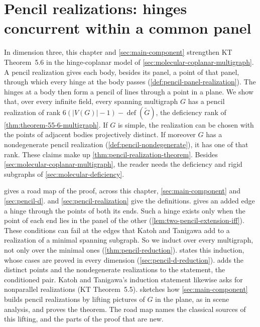 \section{Pencil realizations: hinges concurrent within a common panel}
\label{sec:pencil}

In dimension three, this chapter and \cref{sec:main-component}
strengthen KT Theorem~5.6 in the hinge-coplanar model of
\cref{sec:molecular-coplanar-multigraph}. A pencil realization gives
each body, besides its panel, a point of that panel, through which every
hinge at the body passes (\cref{def:pencil-panel-realization}). The
hinges at a body then form a pencil of lines through a point in a plane.
We show that, over every infinite field, every spanning multigraph $G$
has a pencil realization of rank
$6(|V(G)| - 1) - \operatorname{def}(\tilde G)$, the deficiency rank of
\cref{thm:theorem-55-6-multigraph}. If $G$ is simple, the realization
can be chosen with the points of adjacent bodies projectively distinct.
If moreover $G$ has a nondegenerate pencil realization
(\cref{def:pencil-nondegenerate}), it has one of that rank. These claims
make up \cref{thm:pencil-realization-theorem}. Besides
\cref{sec:molecular-coplanar-multigraph}, the reader needs the
deficiency and rigid subgraphs of \cref{sec:molecular-deficiency}.

 gives a road map of the proof, across this
chapter, \cref{sec:main-component} and \cref{sec:pencil-d}.
 and \cref{sec:pencil-realization} give
the definitions.  gives an added edge a
hinge through the points of both its ends. Such a hinge exists only when
the point of each end lies in the panel of the other
(\cref{lem:two-pencil-extension-iff}). These conditions can fail at the
edges that Katoh and Tanigawa add to a realization of a minimal spanning
subgraph. So we induct over every multigraph, not only over the minimal
ones (\cref{thm:pencil-reduction}). 
states this induction, whose cases are proved in every dimension
(\cref{sec:pencil-d-reduction}).  adds the
distinct points and the nondegenerate realizations to the statement, the
conditioned pair. Katoh and Tanigawa's induction statement likewise asks
for nonparallel realizations (KT Theorem~5.5).
 sketches how
\cref{sec:main-component} builds pencil realizations by lifting pictures
of $G$ in the plane, as in scene analysis, and proves the theorem. The
road map names the classical sources of this lifting, and the parts of
the proof that are new.

